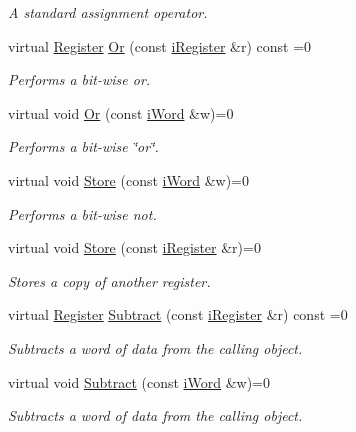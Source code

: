 \begin{DoxyCompactItemize}
\begin{DoxyCompactList}\small\item\em A standard assignment operator. \item\end{DoxyCompactList}\item 
virtual \hyperlink{classRegister}{Register} \hyperlink{classiRegister_af5f065e89ef31d2ed40a1e80d9231bfd}{Or} (const \hyperlink{classiRegister}{iRegister} \&r) const =0
\begin{DoxyCompactList}\small\item\em Performs a bit-\/wise or. \item\end{DoxyCompactList}\item 
virtual void \hyperlink{classiRegister_aa0eac4fe58bde4a280a42fda1c087eee}{Or} (const \hyperlink{classiWord}{iWord} \&w)=0
\begin{DoxyCompactList}\small\item\em Performs a bit-\/wise \char`\"{}or\char`\"{}. \item\end{DoxyCompactList}\item 
virtual void \hyperlink{classiRegister_a8ffac24d1d7326e1a15f9b37cd426969}{Store} (const \hyperlink{classiWord}{iWord} \&w)=0
\begin{DoxyCompactList}\small\item\em Performs a bit-\/wise not. \item\end{DoxyCompactList}\item 
virtual void \hyperlink{classiRegister_ac2b021b80a890f010fc68826e29fee47}{Store} (const \hyperlink{classiRegister}{iRegister} \&r)=0
\begin{DoxyCompactList}\small\item\em Stores a copy of another register. \item\end{DoxyCompactList}\item 
virtual \hyperlink{classRegister}{Register} \hyperlink{classiRegister_ad7eb424400d184f1829664dd4f87ce5c}{Subtract} (const \hyperlink{classiRegister}{iRegister} \&r) const =0
\begin{DoxyCompactList}\small\item\em Subtracts a word of data from the calling object. \item\end{DoxyCompactList}\item 
virtual void \hyperlink{classiRegister_a98de346c2d0b15bee47d76bc5f70e94b}{Subtract} (const \hyperlink{classiWord}{iWord} \&w)=0
\begin{DoxyCompactList}\small\item\em Subtracts a word of data from the calling object. \item\end{DoxyCompactList}\end{DoxyCompactItemize}


